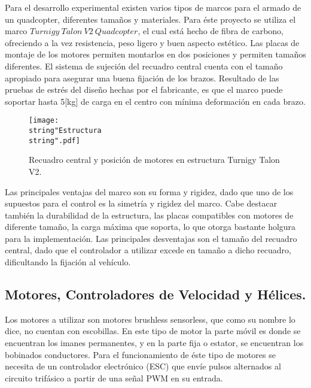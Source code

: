 \documentclass[../main.tex]{subfiles}
\begin{document}
Para el desarrollo experimental existen varios tipos de marcos para
el armado de un quadcopter, diferentes tamaños y materiales. Para
éste proyecto se utiliza el marco $Turnigy\ Talon\ V2\ Quadcopter$,
el cual está hecho de fibra de carbono, ofreciendo a la vez resistencia,
peso ligero y buen aspecto estético. Las placas de montaje de los
motores permiten montarlos en dos posiciones y permiten tamaños diferentes.
El sistema de sujeción del recuadro central cuenta con el tamaño apropiado
para asegurar una buena fijación de los brazos. Resultado de las pruebas
de estrés del diseño hechas por el fabricante, es que el marco puede soportar hasta 5{[}kg{]}
de carga en el centro con mínima deformación en cada brazo. 

\begin{figure}[H]
\noindent \begin{centering}
\texttt{[image: \\string"Estructura\\string".pdf]}
\par\end{centering}
\caption{Recuadro central y posición de motores en estructura Turnigy Talon
V2.}
\end{figure}

Las principales ventajas del marco son su forma y rigidez, dado que
uno de los supuestos para el control es la simetría y rigidez del
marco. Cabe destacar también la durabilidad de la estructura, las
placas compatibles con motores de diferente tamaño, la carga máxima
que soporta, lo que otorga bastante holgura para la implementación.
Las principales desventajas son el tamaño del recuadro central, dado
que el controlador a utilizar excede en tamaño a dicho recuadro, dificultando
la fijación al vehículo.

\subsection{Motores, Controladores de Velocidad y Hélices.}

Los motores a utilizar son motores brushless sensorless, que como
su nombre lo dice, no cuentan con escobillas. En este tipo de motor
la parte móvil es donde se encuentran los imanes permanentes, y en
la parte fija o estator, se encuentran los bobinados conductores.
Para el funcionamiento de éste tipo de motores se necesita de un controlador
electrónico (ESC) que envíe pulsos alternados al circuito trifásico
a partir de una señal PWM en su entrada. 

\textcompwordmark{}
\end{document}
